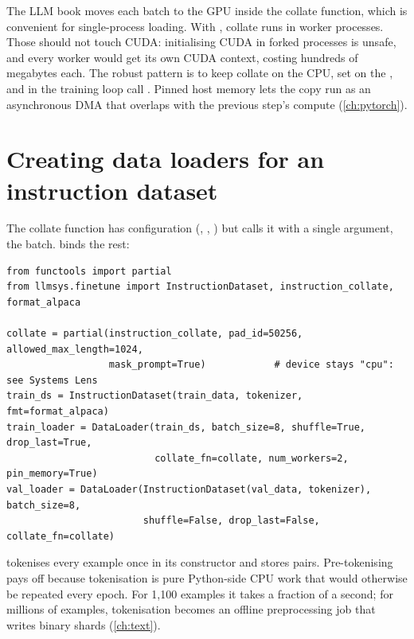 \begin{systemslens}
The LLM book moves each batch to the GPU inside the collate function, which is
convenient for single-process loading. With , collate runs in
worker processes. Those should not touch CUDA: initialising CUDA in forked processes is
unsafe, and every worker would get its own CUDA context, costing hundreds of megabytes
each. The robust pattern is to keep collate on the CPU, set  on
the , and in the training loop call
. Pinned host memory lets the copy run as an
asynchronous DMA that overlaps with the previous step's compute (\cref{ch:pytorch}).
\end{systemslens}

\section{Creating data loaders for an instruction dataset}\label{sec:instruct:loaders}

The collate function has configuration (, ,
) but  calls it with a single argument, the batch.
 binds the rest:

\begin{lstlisting}[caption={Instruction data loaders.},label={lst:instruct:loaders}]
from functools import partial
from llmsys.finetune import InstructionDataset, instruction_collate, format_alpaca

collate = partial(instruction_collate, pad_id=50256, allowed_max_length=1024,
                  mask_prompt=True)            # device stays "cpu": see Systems Lens
train_ds = InstructionDataset(train_data, tokenizer, fmt=format_alpaca)
train_loader = DataLoader(train_ds, batch_size=8, shuffle=True, drop_last=True,
                          collate_fn=collate, num_workers=2, pin_memory=True)
val_loader = DataLoader(InstructionDataset(val_data, tokenizer), batch_size=8,
                        shuffle=False, drop_last=False, collate_fn=collate)
\end{lstlisting}

 tokenises every example once in its constructor and stores
 pairs. Pre-tokenising pays off because tokenisation is pure
Python-side CPU work that would otherwise be repeated every epoch. For 1{,}100 examples
it takes a fraction of a second; for millions of examples, tokenisation becomes an
offline preprocessing job that writes binary shards (\cref{ch:text}).

